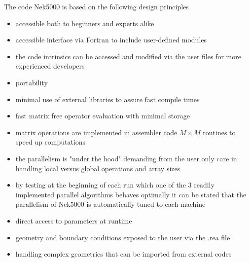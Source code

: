 The code Nek5000 is based on the following design principles
\begin{itemize}
\item accessible both to beginners and experts alike
\item accessible interface via Fortran to include user-defined modules
\item the code intrinsics can be accessed and modified via the user files for more experienced developers
\item portability
\item minimal use of external libraries to assure fast compile times
\item fast matrix free operator evaluation with minimal storage
\item matrix operations are implemented in assembler code $M\times M$ routines to speed up computations
\item the parallelism is "under the hood" demanding from the user only care in handling local versus global operations and array sizes
\item by testing at the beginning of each run which one of the 3 readily implemented parallel algorithms behaves optimally it can be stated that the parallelism of Nek5000 is automatically tuned to each machine
\item direct access to parameters at runtime
\item geometry and boundary conditions exposed to the user via the .rea file
\item handling complex geometries that can be imported from external codes 
\end{itemize}